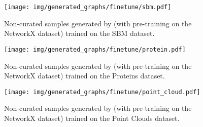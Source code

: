 \begin{figure}[ht]
    \centering
    \texttt{[image: img/generated\_graphs/finetune/sbm.pdf]}
    \caption{Non-curated samples generated by \method{} (with pre-training on the NetworkX dataset) trained on the SBM dataset.}
    \label{app:fig:sbm_samples_pretrained}
\end{figure}

\begin{figure}[ht]
    \centering
    \texttt{[image: img/generated\_graphs/finetune/protein.pdf]}
    \caption{Non-curated samples generated by \method{} (with pre-training on the NetworkX dataset) trained on the Proteins dataset.}
    \label{app:fig:protein_samples_pretrained}
\end{figure}

\begin{figure}[ht]
    \centering
    \texttt{[image: img/generated\_graphs/finetune/point\_cloud.pdf]}
    \caption{Non-curated samples generated by \method{} (with pre-training on the NetworkX dataset) trained on the Point Clouds dataset.}
    \label{app:fig:pointcloud_samples_pretrained}
\end{figure}